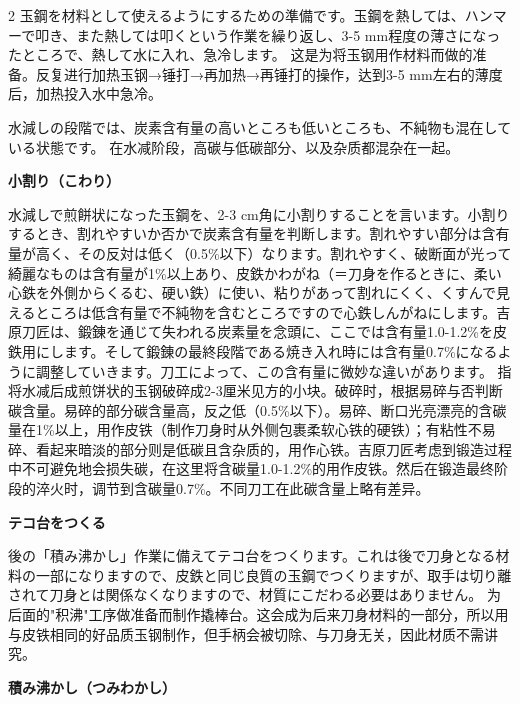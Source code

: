 \documentclass[12pt,UTF8]{ctexbook}
\begin{document}
\begin{paracol}{2}
玉鋼を材料として使えるようにするための準備です。玉鋼を熱しては、ハンマーで叩き、また熱しては叩くという作業を繰り返し、3-5 mm程度の薄さになったところで、熱して水に入れ、急冷します。
\switchcolumn*
这是为将玉钢用作材料而做的准备。反复进行加热玉钢→锤打→再加热→再锤打的操作，达到3-5 mm左右的薄度后，加热投入水中急冷。
\switchcolumn*

水減しの段階では、炭素含有量の高いところも低いところも、不純物も混在している状態です。
\switchcolumn*
在水减阶段，高碳与低碳部分、以及杂质都混杂在一起。
\switchcolumn*

{\bfseries 小割り（こわり）}
\switchcolumn*

水減しで煎餅状になった玉鋼を、2-3 cm角に小割りすることを言います。小割りするとき、割れやすいか否かで炭素含有量を判断します。割れやすい部分は含有量が高く、その反対は低く（0.5\%以下）なります。割れやすく、破断面が光って綺麗なものは含有量が1\%以上あり、皮鉄かわがね（＝刀身を作るときに、柔い心鉄を外側からくるむ、硬い鉄）に使い、粘りがあって割れにくく、くすんで見えるところは低含有量で不純物を含むところですので心鉄しんがねにします。吉原刀匠は、鍛錬を通じて失われる炭素量を念頭に、ここでは含有量1.0-1.2\%を皮鉄用にします。そして鍛錬の最終段階である焼き入れ時には含有量0.7\%になるように調整していきます。刀工によって、この含有量に微妙な違いがあります。
\switchcolumn*
指将水减后成煎饼状的玉钢破碎成2-3厘米见方的小块。破碎时，根据易碎与否判断碳含量。易碎的部分碳含量高，反之低（0.5\%以下）。易碎、断口光亮漂亮的含碳量在1\%以上，用作皮铁（制作刀身时从外侧包裹柔软心铁的硬铁）；有粘性不易碎、看起来暗淡的部分则是低碳且含杂质的，用作心铁。吉原刀匠考虑到锻造过程中不可避免地会损失碳，在这里将含碳量1.0-1.2\%的用作皮铁。然后在锻造最终阶段的淬火时，调节到含碳量0.7\%。不同刀工在此碳含量上略有差异。
\switchcolumn*

{\bfseries テコ台をつくる}
\switchcolumn*

後の「積み沸かし」作業に備えてテコ台をつくります。これは後で刀身となる材料の一部になりますので、皮鉄と同じ良質の玉鋼でつくりますが、取手は切り離されて刀身とは関係なくなりますので、材質にこだわる必要はありません。
\switchcolumn*
为后面的"积沸"工序做准备而制作撬棒台。这会成为后来刀身材料的一部分，所以用与皮铁相同的好品质玉钢制作，但手柄会被切除、与刀身无关，因此材质不需讲究。
\switchcolumn*

{\bfseries 積み沸かし（つみわかし）}
\switchcolumn*


\end{paracol}
\end{document}
